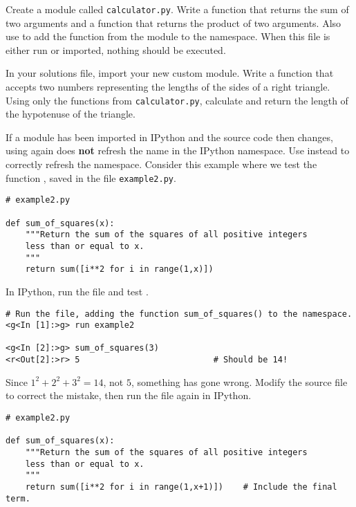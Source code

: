 \begin{problem} %
Create a module called \texttt{calculator.py}.
Write a function that returns the sum of two arguments and a function that returns the product of two arguments.
Also use  to add the  function from the  module to the namespace.
When this file is either run or imported, nothing should be executed.

In your solutions file, import your new custom module.
Write a function that accepts two numbers representing the lengths of the sides of a right triangle.
Using only the functions from \texttt{calculator.py}, calculate and return the length of the hypotenuse of the triangle.
\end{problem}

\begin{warn} %
If a module has been imported in IPython and the source code then changes, using  again does \textbf{not} refresh the name in the IPython namespace.
Use  instead to correctly refresh the namespace.
Consider this example where we test the function , saved in the file \texttt{example2.py}.

\begin{lstlisting}
# example2.py

def sum_of_squares(x):
    """Return the sum of the squares of all positive integers
    less than or equal to x.
    """
    return sum([i**2 for i in range(1,x)])
\end{lstlisting}

In IPython, run the file and test .

\begin{lstlisting}
# Run the file, adding the function sum_of_squares() to the namespace.
<g<In [1]:>g> run example2

<g<In [2]:>g> sum_of_squares(3)
<r<Out[2]:>r> 5                           # Should be 14!
\end{lstlisting}

Since $1^2 + 2^2 + 3^2 = 14$, not $5$, something has gone wrong.
Modify the source file to correct the mistake, then run the file again in IPython.

\begin{lstlisting}
# example2.py

def sum_of_squares(x):
    """Return the sum of the squares of all positive integers
    less than or equal to x.
    """
    return sum([i**2 for i in range(1,x+1)])    # Include the final term.
\end{lstlisting}


\end{warn}
